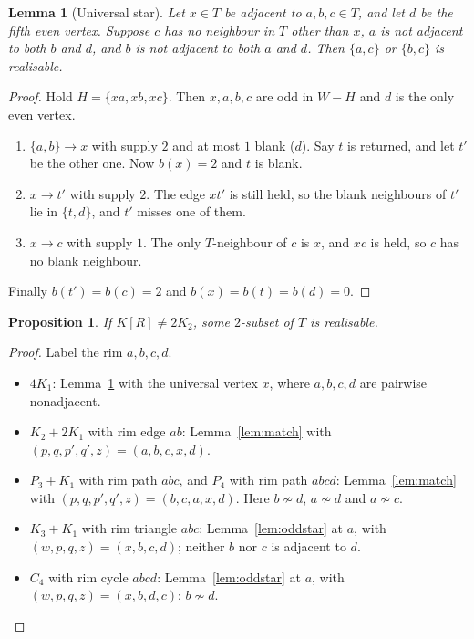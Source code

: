 \documentclass[11pt]{amsart}
\newtheorem{lemma}[theorem]{Lemma}
\newtheorem{proposition}[theorem]{Proposition}
\theoremstyle{definition}
\newcommand{\tr}{\to}
\begin{document}
\begin{lemma}[Universal star]\label{lem:unistar}
Let $x\in T$ be adjacent to $a,b,c\in T$, and let $d$ be the fifth even vertex. Suppose $c$ has no
neighbour in $T$ other than $x$, $a$ is not adjacent to both $b$ and $d$, and $b$ is not adjacent to
both $a$ and $d$. Then $\{a,c\}$ or $\{b,c\}$ is realisable.
\end{lemma}

\begin{proof}
Hold $H=\{xa,xb,xc\}$. Then $x,a,b,c$ are odd in $W-H$ and $d$ is the only even vertex.
\begin{enumerate}
\item $\{a,b\}\tr x$ with supply $2$ and at most $1$ blank ($d$). Say $t$ is returned, and let $t'$
be the other one. Now $b(x)=2$ and $t$ is blank.
\item $x\tr t'$ with supply $2$. The edge $xt'$ is still held, so the blank neighbours of $t'$ lie in
$\{t,d\}$, and $t'$ misses one of them.
\item $x\tr c$ with supply $1$. The only $T$-neighbour of $c$ is $x$, and $xc$ is held, so $c$ has
no blank neighbour.
\end{enumerate}
Finally $b(t')=b(c)=2$ and $b(x)=b(t)=b(d)=0$.
\end{proof}

\begin{proposition}\label{prop:six}
If $K[R]\neq2K_2$, some $2$-subset of $T$ is realisable.
\end{proposition}

\begin{proof}
Label the rim $a,b,c,d$.
\begin{itemize}
\item $4K_1$: Lemma~\ref{lem:unistar} with the universal vertex $x$, where $a,b,c,d$ are pairwise
nonadjacent.
\item $K_2+2K_1$ with rim edge $ab$: Lemma~\ref{lem:match} with $(p,q,p',q',z)=(a,b,c,x,d)$.
\item $P_3+K_1$ with rim path $abc$, and $P_4$ with rim path $abcd$: Lemma~\ref{lem:match} with
$(p,q,p',q',z)=(b,c,a,x,d)$. Here $b\not\sim d$, $a\not\sim d$ and $a\not\sim c$.
\item $K_3+K_1$ with rim triangle $abc$: Lemma~\ref{lem:oddstar} at $a$, with $(w,p,q,z)=(x,b,c,d)$;
neither $b$ nor $c$ is adjacent to $d$.
\item $C_4$ with rim cycle $abcd$: Lemma~\ref{lem:oddstar} at $a$, with $(w,p,q,z)=(x,b,d,c)$;
$b\not\sim d$.\qedhere
\end{itemize}
\end{proof}
\end{document}

